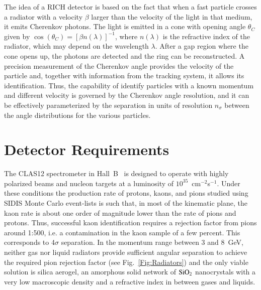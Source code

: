 \documentclass[5p,times,twocolumn]{elsarticle}
\begin{document}
The idea of a RICH detector is based on the fact that when a fast particle crosses a radiator with a velocity $\beta$
larger than the velocity of the light in that medium, it emits Cherenkov photons. The light is emitted in a cone with
opening angle $\theta_C$ given by $\cos(\theta_C)=[\beta n(\lambda)]^{-1}$, where $n(\lambda)$ is the refractive index
of the radiator, which may depend on the wavelength $\lambda$. After a gap region where the cone opens up, the
photons are detected and the ring can be reconstructed. A precision measurement of the Cherenkov angle provides
the velocity of the particle and, together with information from the tracking system, it allows its identification. Thus,
the capability of identify particles with a known momentum and different velocity is governed by the Cherenkov angle
resolution, and it can be effectively parameterized by the separation in units of resolution $n_{\sigma}$ between the
angle distributions for the various particles.

\section{Detector Requirements}

The CLAS12 spectrometer in Hall~B~\cite{REF:overview-nim} is designed to operate with highly polarized beams and
nucleon targets at a luminosity of $10^{35}$~cm$^{-2}$s$^{-1}$. Under these conditions the production rate of protons,
kaons, and pions studied using SIDIS Monte Carlo event-lists is such that, in most of the kinematic plane, the kaon rate
is about one order of magnitude lower than the rate of pions and protons. Thus, successful kaon identification requires
a rejection factor from pions around 1:500, i.e. a contamination in the kaon sample of a few percent. This corresponds to
4$\sigma$ separation. In the momentum range between 3 and 8~GeV, neither gas nor liquid radiators provide sufficient
angular separation to achieve the required pion rejection factor (see Fig.~\ref{Fig:Radiators}) and the only viable
solution is silica aerogel, an amorphous solid network of $\rm SiO_2$ nanocrystals with a very low macroscopic density
and a refractive index in between gases and liquids.
\end{document}
